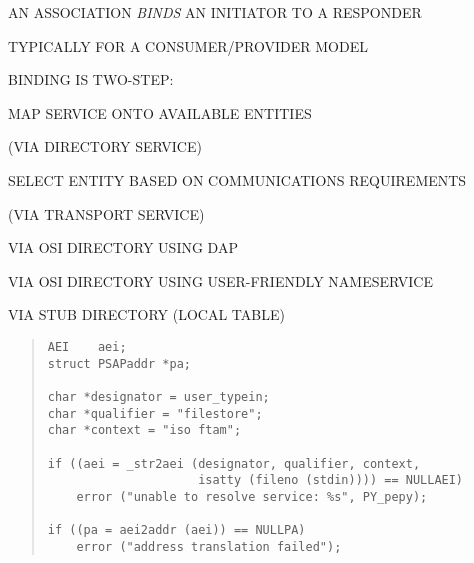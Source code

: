 \begin{bwslide}

\begin{nrtc}
\item	AN ASSOCIATION \emph{BINDS} AN INITIATOR TO A RESPONDER
    \begin{nrtc}
    \item	TYPICALLY FOR A CONSUMER/PROVIDER MODEL
    \end{nrtc}

\item	BINDING IS TWO-STEP:
    \begin{nrtc}
    \item	MAP SERVICE ONTO AVAILABLE ENTITIES
	\begin{nrtc}
	\item	 (VIA DIRECTORY SERVICE)
	\end{nrtc}

    \item	SELECT ENTITY BASED ON COMMUNICATIONS REQUIREMENTS
	\begin{nrtc}
	\item	 (VIA TRANSPORT SERVICE)
	\end{nrtc}
    \end{nrtc}
\end{nrtc}
\end{bwslide}


\begin{bwslide}

\begin{nrtc}
\item	VIA OSI DIRECTORY USING DAP

\item	VIA OSI DIRECTORY USING USER-FRIENDLY NAMESERVICE

\item	VIA STUB DIRECTORY (LOCAL TABLE)
\end{nrtc}
\begin{quote}\small\begin{verbatim}
AEI    aei;
struct PSAPaddr *pa;

char *designator = user_typein;
char *qualifier = "filestore";
char *context = "iso ftam";

if ((aei = _str2aei (designator, qualifier, context,
                     isatty (fileno (stdin)))) == NULLAEI)
    error ("unable to resolve service: %s", PY_pepy);

if ((pa = aei2addr (aei)) == NULLPA)
    error ("address translation failed");
\end{verbatim}\end{quote}
\end{bwslide}


